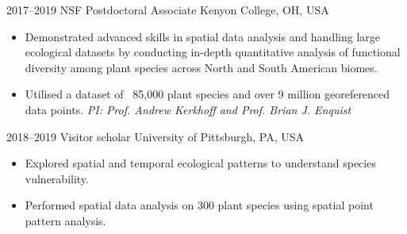 \documentclass[icon]{twentysecondcv}
\begin{document}
\begin{twenty}
{\begin{itemize}
     \end{itemize}}
       
      
\twentyitem
    	{2017--2019}
	{NSF Postdoctoral Associate}
        {Kenyon College, OH, USA}
        {\small \begin{itemize}
       
	\item Demonstrated advanced skills in spatial data analysis and handling large ecological datasets by conducting in-depth quantitative analysis of functional diversity among plant species across North and South American biomes.
  	\item Utilised a dataset of ~85,000 plant species and over 9 million georeferenced data points. \textit{PI: Prof. Andrew Kerkhoff and Prof. Brian J. Enquist}

           \end{itemize} }
           

\twentyitem
    	{2018--2019}
	{Visitor scholar}
        	{University of Pittsburgh, PA, USA}
        	{\small \begin{itemize}
        	\item Explored spatial and temporal ecological patterns to understand species vulnerability.
        	\item Performed spatial data analysis on 300 plant species using spatial point pattern analysis.
  	\end{itemize}
        	}
        	

\end{twenty}
\end{document}
